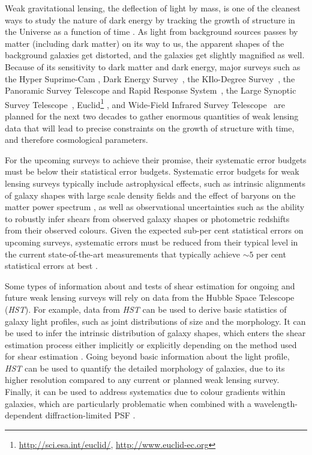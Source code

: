 \documentclass[twocolumn,useAMS,usenatbib]{mn2e}
\begin{document}
Weak gravitational lensing, the deflection of light by mass, is one of the cleanest ways to study the nature of dark energy by tracking the growth of structure in the Universe as a function of time \citep[e.g.,][]{2001PhR...340..291B,2006astro.ph..9591A,2013PhR...530...87W}.
As light from background sources passes by matter (including dark matter) on its way to us, the apparent shapes of the background galaxies get distorted, and the galaxies get slightly magnified as well.
Because of its sensitivity to dark matter and dark energy, major surveys such as the Hyper Suprime-Cam \citep[HSC;][]{HSC_Overview}, Dark Energy Survey~\citep[DES;][]{DESC}, the KIlo-Degree Survey~\citep[KIDS;][]{KIDS}, the Panoramic Survey Telescope and Rapid Response System~\citep[PanSTARRS;][]{PanSTARRS_2010},
the Large Synoptic Survey Telescope~\citep[LSST;][]{LSST_Book}, Euclid\footnote{\url{http://sci.esa.int/euclid/}, \url{http://www.euclid-ec.org}} \citep{EuclidReport},
and Wide-Field Infrared Survey Telescope~\citep[WFIRST;][]{WFIRST_Final}
are planned for the next two decades to gather enormous quantities of weak lensing data that will lead to precise constraints on the growth of structure with time, and therefore cosmological parameters.

For the upcoming surveys to achieve their promise, their systematic error budgets must be below their statistical error budgets.
Systematic error budgets for weak lensing surveys typically include
astrophysical effects, such as intrinsic alignments of galaxy shapes
with large scale density fields \citep[e.g.,][]{2014arXiv1407.6990T} and the effect of baryons on the
matter power spectrum \citep[e.g.,][]{2011MNRAS.415.3649V,2011MNRAS.417.2020S}, as well as observational uncertainties such as
the ability to robustly infer shears from observed galaxy shapes or
photometric redshifts from their observed colours.
Given the expected sub-per cent statistical errors on upcoming surveys, systematic errors must be reduced from
 their typical level in the current state-of-the-art
 measurements that typically achieve $\sim 5$ per cent statistical
 errors at best
 \citep[e.g.,][]{2010A&A...516A..63S,2013MNRAS.432.2433H,2013ApJ...765...74J,2013MNRAS.432.1544M}.

Some types of information about and tests of shear estimation
   for ongoing and future weak lensing surveys will rely on data from
   the Hubble Space Telescope ({\em HST}). 
    For example, data from
   {\em HST} can be used to derive basic statistics of galaxy light
   profiles, such as joint distributions of size and the morphology.
   It can be used to infer the intrinsic distribution of galaxy
   shapes, which enters the shear estimation process either implicitly
 or explicitly depending on the method used for shear estimation
 \citep[see, e.g.,][]{2014MNRAS.439.1909V}.
 Going beyond basic information about the light profile, {\em HST} can
be used to quantify the detailed morphology of galaxies, due to its
higher resolution compared to any current or planned weak lensing
survey.  Finally, it can be used to address systematics due to colour
gradients within galaxies, which are particularly problematic when
combined with a wavelength-dependent diffraction-limited PSF
\citep[e.g.,][]{2012MNRAS.421.1385V,2013MNRAS.432.2385S}.
\end{document}
